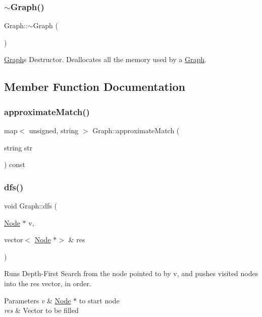 \subsubsection{\texorpdfstring{$\sim$\+Graph()}{~Graph()}}
{\footnotesize\ttfamily Graph\+::$\sim$\+Graph (\begin{DoxyParamCaption}{ }\end{DoxyParamCaption})}

\hyperlink{class_graph}{Graph}\textquotesingle{}s Destructor. Deallocates all the memory used by a \hyperlink{class_graph}{Graph}. 

\subsection{Member Function Documentation}
\hypertarget{class_graph_afc490a45976a80278106a4e49fe479b2}{}\label{class_graph_afc490a45976a80278106a4e49fe479b2} 
\subsubsection{\texorpdfstring{approximate\+Match()}{approximateMatch()}}
{\footnotesize\ttfamily map$<$ unsigned, string $>$ Graph\+::approximate\+Match (\begin{DoxyParamCaption}\item[{string}]{str }\end{DoxyParamCaption}) const}

\hypertarget{class_graph_ab596c4b805ecdf622c4f3d952f894a50}{}\label{class_graph_ab596c4b805ecdf622c4f3d952f894a50} 
\subsubsection{\texorpdfstring{dfs()}{dfs()}}
{\footnotesize\ttfamily void Graph\+::dfs (\begin{DoxyParamCaption}\item[{\hyperlink{class_node}{Node} $\ast$}]{v,  }\item[{vector$<$ \hyperlink{class_node}{Node} $\ast$$>$ \&}]{res }\end{DoxyParamCaption})}

Runs Depth-\/\+First Search from the node pointed to by v, and pushes visited nodes into the res vector, in order.


\begin{DoxyParams}{Parameters}
{\em v} & \hyperlink{class_node}{Node} $\ast$ to start node \\
\hline
{\em res} & Vector to be filled \\
\hline
\end{DoxyParams}
\hypertarget{class_graph_a819fb225997f026a192ec5df1b17df84}{}\label{class_graph_a819fb225997f026a192ec5df1b17df84} 
